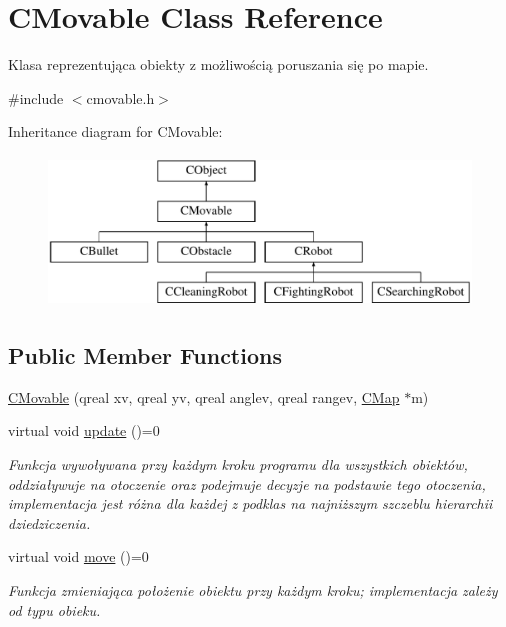 \hypertarget{class_c_movable}{}\section{C\+Movable Class Reference}
\label{class_c_movable}


Klasa reprezentująca obiekty z możliwością poruszania się po mapie.  




{\ttfamily \#include $<$cmovable.\+h$>$}

Inheritance diagram for C\+Movable\+:\begin{figure}[H]
\begin{center}
\leavevmode
\includegraphics[height=4.000000cm]{class_c_movable}
\end{center}
\end{figure}
\subsection*{Public Member Functions}
\begin{DoxyCompactItemize}
\item 
\mbox{\hyperlink{class_c_movable_a5f049731afad44da86ff6e3684c258e9}{C\+Movable}} (qreal xv, qreal yv, qreal anglev, qreal rangev, \mbox{\hyperlink{class_c_map}{C\+Map}} $\ast$m)
\item 
virtual void \mbox{\hyperlink{class_c_movable_af45fc62960d86ef62949d078141e9d62}{update}} ()=0
\begin{DoxyCompactList}\small\item\em Funkcja wywoływana przy każdym kroku programu dla wszystkich obiektów, oddziaływuje na otoczenie oraz podejmuje decyzje na podstawie tego otoczenia, implementacja jest różna dla każdej z podklas na najniższym szczeblu hierarchii dziedziczenia. \end{DoxyCompactList}\item 
virtual void \mbox{\hyperlink{class_c_movable_a8e66e106f13362d24462ce0c9d0431af}{move}} ()=0
\begin{DoxyCompactList}\small\item\em Funkcja zmieniająca położenie obiektu przy każdym kroku; implementacja zależy od typu obieku. \end{DoxyCompactList}\end{DoxyCompactItemize}
